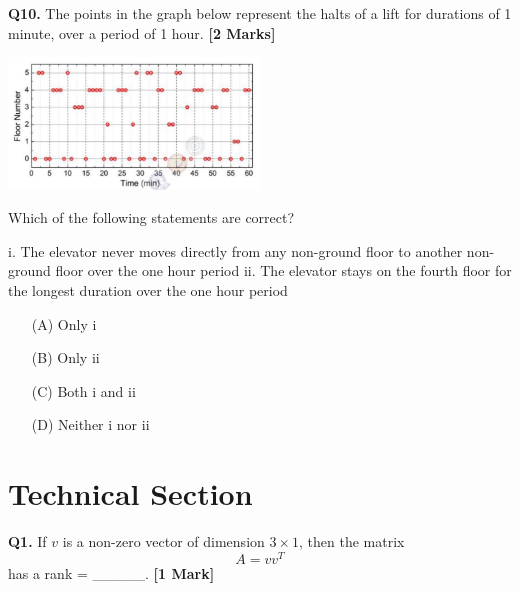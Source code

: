 \documentclass[11pt]{article}
\newcommand{\questiona}[2]{
    \noindent\textbf{Q#2.} #1 \hfill \textbf{[1 Mark]}
}
\newcommand{\questionb}[2]{
    \noindent\textbf{Q#2.} #1 \hfill \textbf{[2 Marks]}
}
\begin{document}
\questionb{The points in the graph below represent the halts of a lift for durations of 1 minute, over a period of 1 hour.}{10}
\begin{center}
\includegraphics[width=0.5\textwidth]{figures/10.png}
\end{center}
Which of the following statements are correct?

i. The elevator never moves directly from any non-ground floor to another non-ground floor over the one hour period  
ii. The elevator stays on the fourth floor for the longest duration over the one hour period  
\begin{enumerate}
    \item[(A)] Only i    
    \item[(B)] Only ii    
    \item[(C)] Both i and ii    
    \item[(D)] Neither i nor ii
\end{enumerate}
\vspace{0.5cm}

\section*{Technical Section}

\questiona{If \( v \) is a non-zero vector of dimension \( 3 \times 1 \), then the matrix  
\[ A = vv^T \]  
has a rank = \_\_\_\_\_.}{1}
\vspace{0.5cm}
\end{document}
